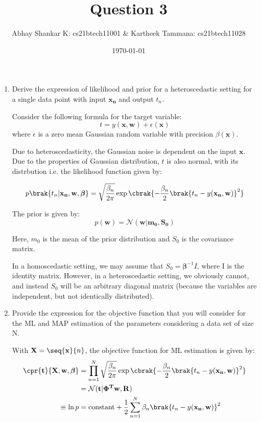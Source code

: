 \documentclass{amsart}
\begin{document}
    \title{Question 3}
    \author{Abhay Shankar K: cs21btech11001 \& Kartheek Tammana: cs21btech11028}
    \date{\today}
    \maketitle

    \begin{enumerate}[label=\textbf{(\Roman*)}]
        \item Derive the expression of likelihood and prior for a heteroscedastic setting for a single data point with input \(\mathbf{x_n}\) and output \(t_n\).
        
        Consider the following formula for the target variable:
        \[t = y(\mathbf{x, w}) + \epsilon(\mathbf{x})\] where \(\epsilon\) is a zero mean Gaussian random variable with precision \(\beta(\mathbf{x})\). 
        
        Due to heteroscedasticity, the Gaussian noise is dependent on the input \(\mathbf{x}\). Due to the properties of Gaussian distribution, \(t\) is also normal, with its distrbution i.e. the likelihood function given by:

        \[p\brak{t_n | \mathbf{x_n}, \mathbf{w}, \boldsymbol{\beta}} = \sqrt{\frac{\beta_n}{2\pi}} \exp \cbrak{- \frac{\beta_n}{2} \brak{t_n - y( \mathbf{x_n, w})}^2}\]


        The prior is given by:
        \[p(\mathbf{w}) = \mathcal{N}(\mathbf{w} | \mathbf{m_0}, \mathbf{S_0})\]

        Here, \(m_0\) is the mean of the prior distribution and \(S_0\) is the covariance matrix.

        In a homoscedastic setting, we may assume that \(S_0 = \mathbf{\beta}^{-1} I\), where I is the identity matrix. However, in a heteroscedastic setting, we obviously cannot, and instead \(S_0\) will be an arbitrary diagonal matrix (because the variables are independent, but not identically distributed).

        \item Provide the expression for the objective function that you will consider for the ML and MAP estimation of the parameters considering a data set of size N.
        
        With \(\mathbf{X} = \seq{\mathbf{x}}{n}\), the objective function for ML estimation is given by:
        \begin{align}
            \cpr{\mathbf{t}}{\mathbf{X}, \mathbf{w}, \boldsymbol{\beta}} &= \prod_{n = 1}^{N} \sqrt{\frac{\beta_n}{2\pi}} \exp \cbrak{- \frac{\beta_n}{2} \brak{t_n - y(\mathbf{x_n, w})}^2} \\
            &= \mathcal{N} (\mathbf{t}|\mathbf{\Phi^Tw, R})\\
            \equiv \ln p &= \text{constant} + \frac{1}{2} \sum_{n = 1}^{N} \beta_n \brak{t_n - y(\mathbf{x_n, w})}^2 \label{eq:ml}
        \end{align}


\end{enumerate}
\end{document}
